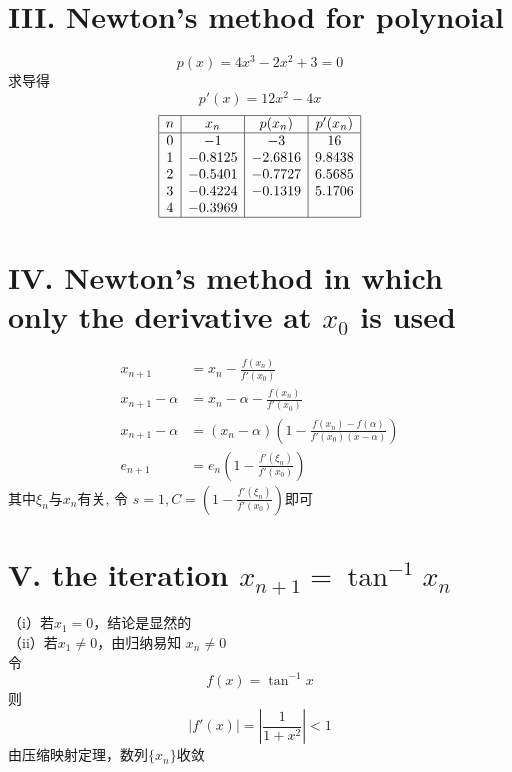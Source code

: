 \documentclass[a4paper]{article}
\begin{document}
\section*{III. Newton's method for polynoial} 
\[
p(x) = 4x^3 - 2x^2 + 3 = 0
\]
求导得
\[
p'(x) = 12x^2 - 4x
\]
\[
\begin{array}{|c|c|c|c|}
\hline
n & x_n & p(x_n) & p'(x_n) \\
\hline
0 & -1 & -3 & 16 \\
1 & -0.8125 & -2.6816 & 9.8438 \\
2 & -0.5401 & -0.7727 & 6.5685 \\
3 & -0.4224 & -0.1319 & 5.1706 \\
4 & -0.3969 & & \\
\hline
\end{array}
\]

\section*{IV. Newton's method in which only the derivative at $x_0$ is used}

\begin{align*}
    x_{n+1} &= x_n - \frac{f(x_n)}{f'(x_0)} \\  
    x_{n+1} - \alpha &= x_n - \alpha - \frac{f(x_n)}{f'(x_0)} \\ 
    x_{n+1} - \alpha &= (x_n - \alpha) \left( 1 - \frac{f(x_n) - f( \alpha)}{f'(x_0)(x-\alpha)} \right)\\
    e_{n+1} &= e_n \left(1 - \frac{f'(\xi _n)}{f'(x_0)} \right)
\end{align*}
其中$\xi _n$与$x_n$有关, 令 $s = 1, C = \left(1 - \frac{f'(\xi _n)}{f'(x_0)} \right)$即可

\section*{V. the iteration $x_{n+1} = \tan ^{-1} x_n$}
（i）若$x_1 = 0$，结论是显然的\\
（ii）若$x_1 \neq 0$，由归纳易知 $x_n \neq 0 $ \\
令 $$f(x) = \tan ^{-1} x $$ 则$$|f'(x)| = \left| \frac{1}{1+x^2}\right| < 1$$
由压缩映射定理，数列$\{x_n\}$收敛
\end{document}
